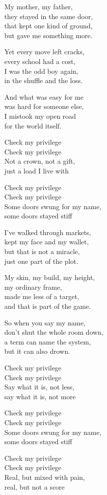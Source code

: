 \begin{lyrics}
My mother, my father,\\
they stayed in the same door,\\
that kept one kind of ground,\\
but gave me something more.

Yet every move left cracks,\\
every school had a cost,\\
I was the odd boy again,\\
in the shuffle and the loss.

And what was easy for me\\
was hard for someone else,\\
I mistook my open road\\
for the world itself.

Check my privilege\\
Check my privilege\\
Not a crown, not a gift,\\
just a load I live with

Check my privilege\\
Check my privilege\\
Some doors swung for my name,\\
some doors stayed stiff

I’ve walked through markets,\\
kept my face and my wallet,\\
but that is not a miracle,\\
just one part of the plot.

My skin, my build, my height,\\
my ordinary frame,\\
made me less of a target,\\
and that is part of the game.

So when you say my name,\\
don’t shut the whole room down,\\
a term can name the system,\\
but it can also drown.

Check my privilege\\
Check my privilege\\
Say what it is, not less,\\
say what it is, not more

Check my privilege\\
Check my privilege\\
Some doors swung for my name,\\
some doors stayed stiff

Check my privilege\\
Check my privilege\\
Real, but mixed with pain,\\
real, but not a score
\end{lyrics}

